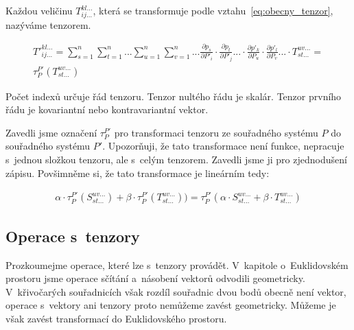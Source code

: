 \begin{fact}

Každou veličinu \(T_{ij...}^{kl...}\), která se transformuje podle vztahu~\eqref{eq:obecny_tenzor}, nazýváme tenzorem.

\begin{equation}
\label{eq:obecny_tenzor}
\begin{split}
T'^{kl...}_{ij...} = \sum_{s=1}^n \sum_{t=1}^n ... \sum_{u=1}^n \sum_{v=1}^n ... \frac{\partial p_s}{\partial P'_i} \cdot \frac{\partial p_t}{\partial P'_j} ... \cdot \frac{\partial p'_k}{\partial P_u} \cdot \frac{\partial p'_l}{\partial P_v} ... \cdot T_{st...}^{uv...} = \\
\tau_{P}^{P'} (T_{st...}^{uv...})
\end{split}
\end{equation}

\end{fact}

Počet indexů určuje řád tenzoru. Tenzor nultého řádu je skalár. Tenzor prvního řádu je kovariantní nebo kontravariantní vektor.

Zavedli jsme označení \(\tau_{P}^{P'}\) pro transformaci tenzoru ze souřadného systému \(P\) do souřadného systému \(P'\). Upozorňuji, že tato transformace není funkce, nepracuje s~jednou složkou tenzoru, ale s~celým tenzorem. Zavedli jsme ji pro zjednodušení zápisu. Povšimněme si, že tato transformace je lineárním tedy:

\begin{equation}
\label{eq:linearni_transformace_tenzoru}
\begin{split}
\alpha \cdot \tau_{P}^{P'}(S_{st...}^{uv...}) + \beta \cdot \tau_{P}^{P'}(T_{st...}^{uv...})) = \tau_{P}^{P'}(\alpha \cdot S_{st...}^{uv...} + \beta \cdot T_{st...}^{uv...})
\end{split}
\end{equation}

\subsection{Operace s~tenzory}

Prozkoumejme operace, které lze s~tenzory provádět. V~kapitole o~Euklidovském prostoru jsme operace sčítání a~násobení vektorů odvodili geometricky. V~křivočarých souřadnicích však rozdíl souřadnic dvou bodů obecně není vektor, operace s~vektory ani tenzory proto nemůžeme zavést geometricky. Můžeme je však zavést transformací do Euklidovského prostoru.

